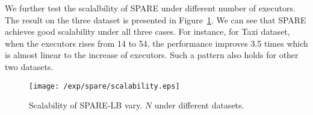 We further test the scalalbility of SPARE under different number of executors. 
The result on the three dataset is presented in Figure~\ref{exp:scalability}.
We can see that SPARE achieves good scalability under all three cases. 
For instance, for Taxi dataset, when the executors rises from 14 to 54, 
the performance improves 3.5 times which is almost linear to the increase of executors. 
Such a pattern also holds for other two datasets.
\begin{figure}[h]
\centering
   \texttt{[image: /exp/spare/scalability.eps]}
\caption{Scalability of SPARE-LB vary. $N$ under different datasets.}
\label{exp:scalability}
\end{figure}



